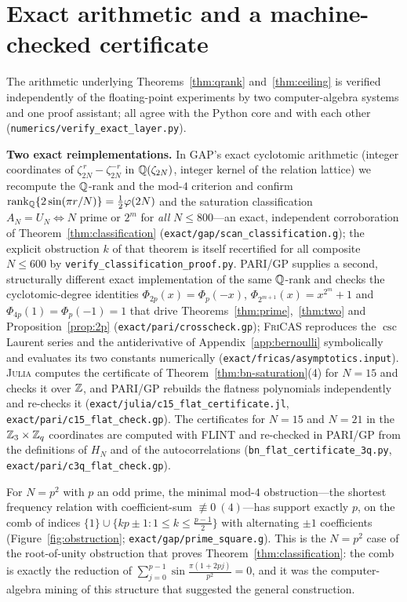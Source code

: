 \section{Exact arithmetic and a machine-checked certificate}\label{sec:formal}

The arithmetic underlying Theorems~\ref{thm:qrank} and~\ref{thm:ceiling} is verified independently of the
floating-point experiments by two computer-algebra systems and one proof assistant; all agree with the
Python core and with each other (\texttt{numerics/verify\_exact\_layer.py}).

\medskip\noindent\textbf{Two exact reimplementations.} In \textsc{GAP}'s exact cyclotomic arithmetic
(integer coordinates of $\zeta_{2N}^{\,r}-\zeta_{2N}^{-r}$ in $\mathbb{Q}(\zeta_{2N})$, integer kernel of the
relation lattice) we recompute the $\mathbb{Q}$-rank and the mod-$4$ criterion and confirm
$\operatorname{rank}_{\mathbb{Q}}\{2\sin(\pi r/N)\}=\tfrac12\varphi(2N)$ and the saturation classification
$A_N=U_N\Leftrightarrow N\text{ prime or }2^m$ for \emph{all} $N\le800$---an exact, independent
corroboration of Theorem~\ref{thm:classification} (\texttt{exact/gap/scan\_classification.g}); the explicit
obstruction $k$ of that theorem is itself recertified for all composite $N\le600$ by
\texttt{verify\_classification\_proof.py}.
\textsc{PARI/GP} supplies a second, structurally different exact implementation of the same $\mathbb{Q}$-rank and
checks the cyclotomic-degree identities $\Phi_{2p}(x)=\Phi_p(-x)$, $\Phi_{2^{m+1}}(x)=x^{2^m}+1$ and
$\Phi_{4p}(1)=\Phi_p(-1)=1$ that drive Theorems~\ref{thm:prime},~\ref{thm:two} and
Proposition~\ref{prop:2p} (\texttt{exact/pari/crosscheck.gp}); \textsc{FriCAS} reproduces the $\csc$
Laurent series and the antiderivative of Appendix~\ref{app:bernoulli} symbolically and evaluates its two
constants numerically (\texttt{exact/fricas/asymptotics.input}). \textsc{Julia} computes the certificate of
Theorem~\ref{thm:bn-saturation}(4) for $N=15$ and checks it over $\mathbb{Z}$, and \textsc{PARI/GP} rebuilds the flatness
polynomials independently and re-checks it (\texttt{exact/julia/c15\_flat\_certificate.jl},
\texttt{exact/pari/c15\_flat\_check.gp}). The certificates for $N=15$ and $N=21$ in the $\mathbb{Z}_3\times\mathbb{Z}_q$
coordinates are computed with FLINT and re-checked in \textsc{PARI/GP} from the definitions of $H_N$ and of the
autocorrelations (\texttt{bn\_flat\_certificate\_3q.py}, \texttt{exact/pari/c3q\_flat\_check.gp}).

\begin{observation}\label{obs:psq}
For $N=p^2$ with $p$ an odd prime, the minimal mod-$4$ obstruction---the shortest frequency relation with
coefficient-sum $\not\equiv0\ (4)$---has support exactly $p$, on the comb of indices
$\{1\}\cup\{kp\pm1:1\le k\le\tfrac{p-1}2\}$ with alternating $\pm1$ coefficients
(Figure~\ref{fig:obstruction}; \texttt{exact/gap/prime\_square.g}). This is the $N=p^2$ case of the
root-of-unity obstruction that proves Theorem~\ref{thm:classification}: the comb is exactly the reduction
of $\sum_{j=0}^{p-1}\sin\frac{\pi(1+2pj)}{p^2}=0$, and it was the computer-algebra mining of this structure
that suggested the general construction.
\end{observation}

